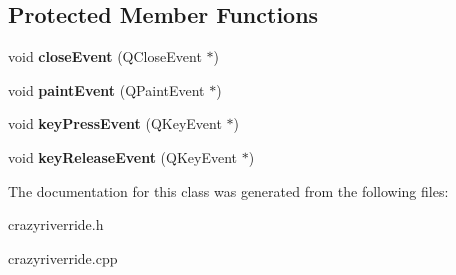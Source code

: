\subsection*{Protected Member Functions}
\begin{DoxyCompactItemize}
\item 
\hypertarget{class_crazy_river_ride_a1b5346e20df6444e9cdd3e3c978d6a67}{void {\bfseries close\-Event} (Q\-Close\-Event $\ast$)}\label{class_crazy_river_ride_a1b5346e20df6444e9cdd3e3c978d6a67}

\item 
\hypertarget{class_crazy_river_ride_a8a163207bf92442bdfe0ea382d6e7e7d}{void {\bfseries paint\-Event} (Q\-Paint\-Event $\ast$)}\label{class_crazy_river_ride_a8a163207bf92442bdfe0ea382d6e7e7d}

\item 
\hypertarget{class_crazy_river_ride_a87f27420c335b9b693e7dcfe8e0c3281}{void {\bfseries key\-Press\-Event} (Q\-Key\-Event $\ast$)}\label{class_crazy_river_ride_a87f27420c335b9b693e7dcfe8e0c3281}

\item 
\hypertarget{class_crazy_river_ride_af0846544ef52af8e9f7476fa9f7f2f73}{void {\bfseries key\-Release\-Event} (Q\-Key\-Event $\ast$)}\label{class_crazy_river_ride_af0846544ef52af8e9f7476fa9f7f2f73}

\end{DoxyCompactItemize}


The documentation for this class was generated from the following files\-:\begin{DoxyCompactItemize}
\item 
crazyriverride.\-h\item 
crazyriverride.\-cpp\end{DoxyCompactItemize}
